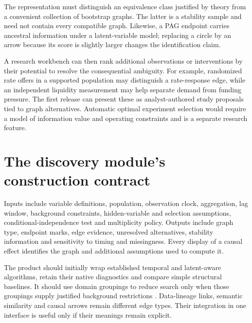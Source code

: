 The representation must distinguish an equivalence class justified by
theory from a convenient collection of bootstrap graphs. The latter is a
stability sample and need not contain every compatible graph. Likewise,
a PAG endpoint carries ancestral information under a latent-variable
model; replacing a circle by an arrow because its score is slightly larger
changes the identification claim.

A research workbench can then rank additional observations or interventions
by their potential to resolve the consequential ambiguity. For example,
randomized rate offers in a supported population may distinguish a
rate-response edge, while an independent liquidity measurement may help
separate demand from funding pressure. The first release can present these
as analyst-authored study proposals tied to graph alternatives. Automatic
optimal experiment selection would require a model of information value
and operating constraints and is a separate research feature.

\section{The discovery module's construction contract}
Inputs include variable definitions, population, observation clock,
aggregation, lag window, background constraints, hidden-variable and
selection assumptions, conditional-independence test and multiplicity
policy. Outputs include graph type, endpoint marks, edge evidence,
unresolved alternatives, stability information and sensitivity to timing
and missingness. Every display of a causal effect identifies the graph
and additional assumptions used to compute it.

The product should initially wrap established temporal and latent-aware
algorithms, retain their native diagnostics and compare simple structural
baselines. It should use domain groupings to reduce search only when those
groupings supply justified background restrictions
\citep{vargas2026}. Data-lineage links, semantic similarity and causal
arrows remain different edge types. Their integration in one interface
is useful only if their meanings remain explicit.
